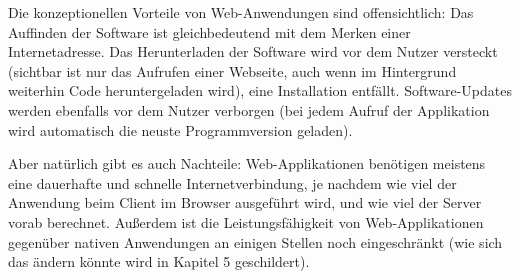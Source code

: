 Die konzeptionellen Vorteile von Web-Anwendungen sind offensichtlich: Das Auffinden der Software ist gleichbedeutend mit dem Merken einer Internetadresse. Das Herunterladen der Software wird vor dem Nutzer versteckt (sichtbar ist nur das Aufrufen einer Webseite, auch wenn im Hintergrund weiterhin Code heruntergeladen wird), eine Installation entfällt. Software-Updates werden ebenfalls vor dem Nutzer verborgen (bei jedem Aufruf der Applikation wird automatisch die neuste Programmversion geladen).

Aber natürlich gibt es auch Nachteile: Web-Applikationen benötigen meistens eine dauerhafte und schnelle Internetverbindung, je nachdem wie viel der Anwendung beim Client im Browser ausgeführt wird, und wie viel der Server vorab berechnet. Außerdem ist die Leistungsfähigkeit von Web-Applikationen gegenüber nativen Anwendungen an einigen Stellen noch eingeschränkt (wie sich das ändern könnte wird in Kapitel 5 geschildert).

